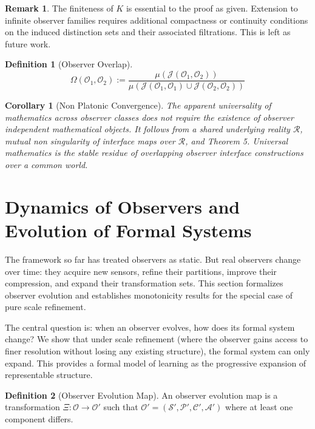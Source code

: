 \documentclass[12pt]{article}
\newtheorem{corollary}{Corollary}
\theoremstyle{definition}
\newtheorem{definition}{Definition}
\newtheorem{remark}{Remark}
\begin{document}
\begin{remark}
The finiteness of $K$ is essential to the proof as given. Extension to infinite observer families requires additional compactness or continuity conditions on the induced distinction sets and their associated filtrations. This is left as future work.
\end{remark}

\begin{definition}[Observer Overlap]
\begin{equation}
\Omega(\mathcal{O}_1, \mathcal{O}_2) := \frac{\mu(\mathcal{J}(\mathcal{O}_1, \mathcal{O}_2))}{\mu(\mathcal{J}(\mathcal{O}_1, \mathcal{O}_1) \cup \mathcal{J}(\mathcal{O}_2, \mathcal{O}_2))}
\end{equation}
\end{definition}

\begin{corollary}[Non Platonic Convergence]
The apparent universality of mathematics across observer classes does not require the existence of observer independent mathematical objects. It follows from a shared underlying reality $\mathcal{R}$, mutual non singularity of interface maps over $\mathcal{R}$, and Theorem 5. Universal mathematics is the stable residue of overlapping observer interface constructions over a common world.
\end{corollary}

\section{Dynamics of Observers and Evolution of Formal Systems}

The framework so far has treated observers as static. But real observers change over time: they acquire new sensors, refine their partitions, improve their compression, and expand their transformation sets. This section formalizes observer evolution and establishes monotonicity results for the special case of pure scale refinement.

The central question is: when an observer evolves, how does its formal system change? We show that under scale refinement (where the observer gains access to finer resolution without losing any existing structure), the formal system can only expand. This provides a formal model of learning as the progressive expansion of representable structure.

\begin{definition}[Observer Evolution Map]
An observer evolution map is a transformation $\Xi: \mathcal{O} \to \mathcal{O}'$ such that $\mathcal{O}' = (\mathcal{S}', \mathcal{P}', \mathcal{C}', \mathcal{A}')$ where at least one component differs.
\end{definition}
\end{document}
